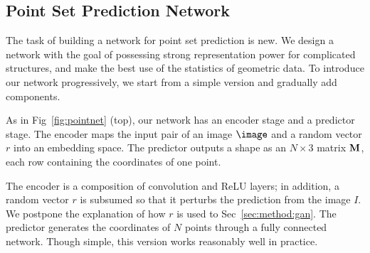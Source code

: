 


\subsection{Point Set Prediction Network}
\label{sec:method:network}
% 
% 
The task of building a network for point set prediction is new. We design a network with the goal of possessing strong representation power for complicated structures, and make the best use of the statistics of geometric data. 
To introduce our network progressively, we start from a simple version and gradually add components.


As in Fig~\ref{fig:pointnet} (top), our network has an encoder stage and a predictor stage. The encoder maps the input pair of an image $\image$ and a random vector $r$ into an embedding space. The predictor outputs a shape as an $N\times 3$ matrix ${\bf M}$, each row containing the coordinates of one point.

The encoder is a composition of convolution and ReLU layers; in addition, a random vector $r$ is subsumed so that it perturbs the prediction from the image $I$. We postpone the explanation of how $r$ is used to Sec~\ref{sec:method:gan}. %
The predictor generates the coordinates of $N$ points through a fully connected network. Though simple, this version works reasonably well in practice. 

